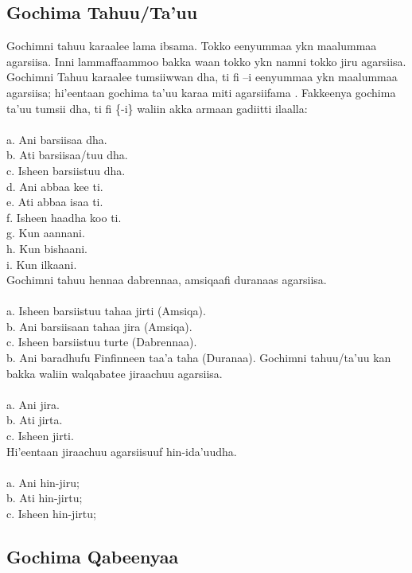 \documentclass[11pt,b5paper]{book}
\begin{document}
\subsection{Gochima Tahuu/Ta'uu}
Gochimni tahuu karaalee lama ibsama. Tokko eenyummaa ykn maalummaa agarsiisa. Inni lammaffaammoo bakka waan tokko
ykn namni tokko jiru agarsiisa. Gochimni Tahuu karaalee tumsiiwwan dha, ti fi –i eenyummaa ykn maalummaa agarsiisa; hi’eentaan gochima ta’uu karaa miti agarsiifama \cite[p.90]{griefenow2001grammatical}.
Fakkeenya gochima ta’uu tumsii dha, ti fi \{-i\} waliin akka armaan gadiitti ilaalla:\\
\\
a. Ani barsiisaa dha.\\
b. Ati barsiisaa/tuu dha.\\
c. Isheen barsiistuu dha.\\
d. Ani abbaa kee ti.\\
e. Ati abbaa isaa ti.\\
f. Isheen haadha koo ti. \\
g. Kun aannani.\\
h. Kun bishaani.\\
i. Kun ilkaani. \\

Gochimni tahuu hennaa dabrennaa, amsiqaafi duranaas agarsiisa. \\
\\
a. Isheen barsiistuu tahaa jirti (Amsiqa).\\
b. Ani barsiisaan tahaa jira (Amsiqa).\\
c. Isheen barsiistuu turte (Dabrennaa).\\
b. Ani baradhufu Finfinneen taa’a taha (Duranaa). 
Gochimni tahuu/ta’uu kan bakka waliin walqabatee jiraachuu agarsiisa. \\
\\
a. Ani jira.\\
b. Ati jirta.\\
c. Isheen jirti.\\

Hi’eentaan jiraachuu agarsiisuuf hin-ida’uudha.\\
\\
a. Ani hin-jiru;\\
b. Ati hin-jirtu;\\
c. Isheen hin-jirtu;\\

\subsection{Gochima Qabeenyaa}
\end{document}
